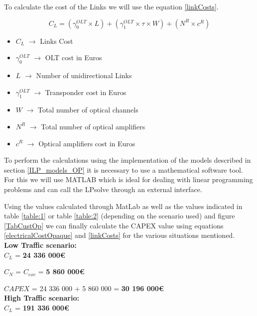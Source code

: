 To calculate the cost of the Links we will use the equation \ref{linkCosts}.

\begin{equation}
C_L = \left(\gamma_0^{OLT} \times L\right) + \left(\gamma_1^{OLT} \times \tau \times W\right) + \left(N^R \times c^R\right)
\label{linkCosts}
\end{equation}	
	
\begin{itemize}
\item{$C_L$				$\rightarrow$	Links Cost}
\item{$\gamma_0^{OLT}$	$\rightarrow$	OLT cost in Euros}
\item{$L$				$\rightarrow$	Number of unidirectional Links}
\item{$\gamma_1^{OLT}$	$\rightarrow$	Transponder cost in Euros}
\item{$W$             $\rightarrow$	Total number of optical channels}
\item{$N^R$				$\rightarrow$	Total number of optical amplifiers}
\item{$c^R$				$\rightarrow$	Optical amplifiers cost in Euros}
\end{itemize}

To perform the calculations using the implementation of the models described in section \ref{ILP_models_OP} it is necessary to use a mathematical software tool. For this we will use MATLAB which is ideal for dealing with linear programming problems and can call the LPsolve through an external interface.

\pagebreak
Using the values calculated through MatLab as well as the values indicated in table \ref{table:1} or table \ref{table:2} (depending on the scenario used) and figure \ref{TabCustOp} we can finally calculate the CAPEX value using equations \ref{electricalCostOpaque} and \ref{linkCosts} for the various situations mentioned.\\

\textbf{Low Traffic scenario:}\\

$C_L$ = \textbf{24 336 000\euro}

$C_N$ = $C_{exc}$ = \textbf{5 860 000\euro}

$CAPEX$ = 24 336 000 + 5 860 000 = \textbf{30 196 000\euro}\\

\textbf{High Traffic scenario:}\\

$C_L$ = \textbf{191 336 000\euro}

